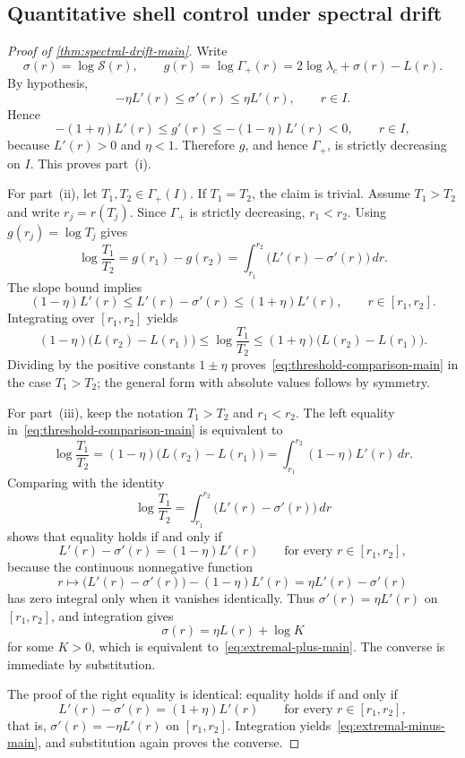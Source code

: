 \subsection{Quantitative shell control under spectral drift}

\begin{proof}[Proof of \cref{thm:spectral-drift-main}]
Write
\[
\sigma(r)=\log\mathcal S(r),
\qquad
g(r)=\log\Gamma_+(r)=2\log\lambda_c+\sigma(r)-L(r).
\]
By hypothesis,
\[
-\eta L'(r)\le \sigma'(r)\le \eta L'(r),
\qquad r\in I.
\]
Hence
\begin{equation}\label{eq:appendix-gprime-bounds}
-(1+\eta)L'(r)\le g'(r)\le -(1-\eta)L'(r)<0,
\qquad r\in I,
\end{equation}
because $L'(r)>0$ and $\eta<1$. Therefore $g$, and hence $\Gamma_+$, is strictly decreasing on $I$. This proves part~(i).

For part~(ii), let $T_1,T_2\in\Gamma_+(I)$. If $T_1=T_2$, the claim is trivial. Assume $T_1>T_2$ and write $r_j=r(T_j)$. Since $\Gamma_+$ is strictly decreasing, $r_1<r_2$. Using $g(r_j)=\log T_j$ gives
\[
\log\frac{T_1}{T_2}
=
g(r_1)-g(r_2)
=
\int_{r_1}^{r_2}\bigl(L'(r)-\sigma'(r)\bigr)\,dr.
\]
The slope bound implies
\[
(1-\eta)L'(r)\le L'(r)-\sigma'(r)\le (1+\eta)L'(r),
\qquad r\in[r_1,r_2].
\]
Integrating over $[r_1,r_2]$ yields
\[
(1-\eta)\bigl(L(r_2)-L(r_1)\bigr)
\le
\log\frac{T_1}{T_2}
\le
(1+\eta)\bigl(L(r_2)-L(r_1)\bigr).
\]
Dividing by the positive constants $1\pm\eta$ proves~\eqref{eq:threshold-comparison-main} in the case $T_1>T_2$; the general form with absolute values follows by symmetry.

For part~(iii), keep the notation $T_1>T_2$ and $r_1<r_2$. The left equality in~\eqref{eq:threshold-comparison-main} is equivalent to
\[
\log\frac{T_1}{T_2}
=(1-\eta)\bigl(L(r_2)-L(r_1)\bigr)
=
\int_{r_1}^{r_2}(1-\eta)L'(r)\,dr.
\]
Comparing with the identity
\[
\log\frac{T_1}{T_2}
=
\int_{r_1}^{r_2}\bigl(L'(r)-\sigma'(r)\bigr)\,dr
\]
shows that equality holds if and only if
\[
L'(r)-\sigma'(r)=(1-\eta)L'(r)
\qquad\text{for every }r\in[r_1,r_2],
\]
because the continuous nonnegative function
\[
r\longmapsto \bigl(L'(r)-\sigma'(r)\bigr)-(1-\eta)L'(r)
=
\eta L'(r)-\sigma'(r)
\]
has zero integral only when it vanishes identically. Thus $\sigma'(r)=\eta L'(r)$ on $[r_1,r_2]$, and integration gives
\[
\sigma(r)=\eta L(r)+\log K
\]
for some $K>0$, which is equivalent to~\eqref{eq:extremal-plus-main}. The converse is immediate by substitution.

The proof of the right equality is identical: equality holds if and only if
\[
L'(r)-\sigma'(r)=(1+\eta)L'(r)
\qquad\text{for every }r\in[r_1,r_2],
\]
that is, $\sigma'(r)=-\eta L'(r)$ on $[r_1,r_2]$. Integration yields~\eqref{eq:extremal-minus-main}, and substitution again proves the converse.
\end{proof}

